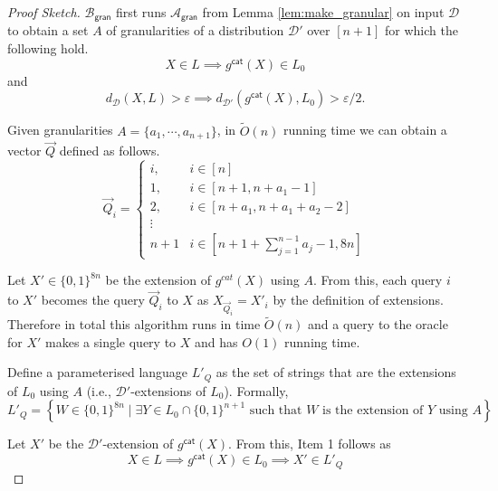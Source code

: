 \documentclass[11pt]{article}
\newcommand{\gran}{\mathsf{gran}}
\newcommand{\sD}{\mathcal{D}}
\newcommand{\sA}{\mathcal{A}}
\newcommand{\sB}{\mathcal{B}}
\begin{document}
\begin{proof}[Proof Sketch]
$\sB_\gran$ first runs $\sA_\gran$ from Lemma \ref{lem:make_granular} on input $\sD$ to obtain a set $A$ of granularities of a distribution $\sD'$ over $[n+1]$ for which the following hold.
\begin{equation*}
    X\in L\implies g^{\mathsf{cat}}(X)\in L_0
\end{equation*}
and 
\begin{equation*}
    d_{\sD}(X,L)>\varepsilon\implies d_{\sD'}(g^{\mathsf{cat}}(X),L_{0})>\varepsilon/2.
\end{equation*}

Given granularities $A = \{a_{1},\cdots, a_{n+1}\}$, in $\tilde{O}(n)$ running time we can obtain a vector $\vec{Q}$ defined as follows.
\begin{equation*}
    \Vec{Q}_{i}=\begin{cases}
            i, & i\in [n]\\
			1, & i\in[n+1, n+a_{1}-1]\\
            2, & i\in[n+a_{1},n+ a_{1}+a_{2}-2]\\
            \vdots\\
            n+1 & i\in [n+1+\sum_{j=1}^{n-1}a_{j}-1, 8n]
		 \end{cases}
\end{equation*}

Let $X'\in\{0,1\}^{8n}$ be the extension of $g^{cat}(X)$ using $A$. From this, each query $i$ to $X'$ becomes the query $\vec{Q}_{i}$ to $X$ as $X_{\Vec{Q}_{i}}=X'_{i}$ by the definition of extensions. Therefore in total this algorithm runs in time $\tilde{O}(n)$ and a query to the oracle for $X'$ makes a single query to $X$ and has $O(1)$ running time.

Define a parameterised language $L'_Q$ as the set of strings that are the extensions of $L_0$ using $A$ (i.e., $\sD'$-extensions of $L_0$). Formally,
\begin{equation*}
    L'_Q = \left \{W \in \{0,1\}^{8n} \mid \exists Y \in L_0 \cap \{0,1\}^{n+1} \text{ such that } W \text{ is the extension of $Y$ using $A$} \right \}
\end{equation*}



Let $X'$ be the $\sD'$-extension of $g^{\mathsf{cat}}(X)$. From this, Item 1 follows as 
\begin{equation*}
    X\in L\implies g^{\mathsf{cat}}(X)\in L_{0}\implies X'\in L'_Q
\end{equation*}


\end{proof}
\end{document}
